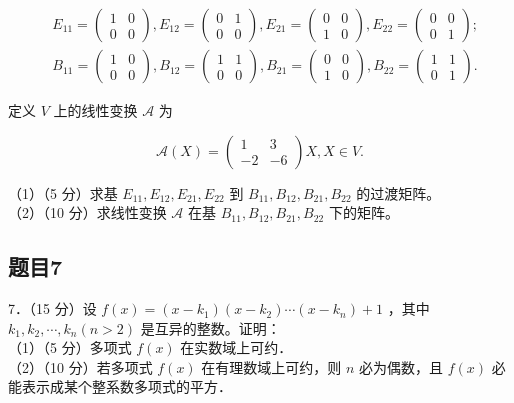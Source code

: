 \documentclass{article}
\begin{document}
\[
\begin{aligned}
& E_{11}=\left(\begin{array}{ll}
1 & 0 \\
0 & 0
\end{array}\right), E_{12}=\left(\begin{array}{ll}
0 & 1 \\
0 & 0
\end{array}\right), E_{21}=\left(\begin{array}{ll}
0 & 0 \\
1 & 0
\end{array}\right), E_{22}=\left(\begin{array}{ll}
0 & 0 \\
0 & 1
\end{array}\right) ; \\
& B_{11}=\left(\begin{array}{ll}
1 & 0 \\
0 & 0
\end{array}\right), B_{12}=\left(\begin{array}{ll}
1 & 1 \\
0 & 0
\end{array}\right), B_{21}=\left(\begin{array}{ll}
0 & 0 \\
1 & 0
\end{array}\right), B_{22}=\left(\begin{array}{ll}
1 & 1 \\
0 & 1
\end{array}\right) .
\end{aligned}
\]

定义 \(V\) 上的线性变换 \(\mathcal{A}\) 为

\[
\mathcal{A}(X)=\left(\begin{array}{cc}
1 & 3 \\
-2 & -6
\end{array}\right) X, X \in V .
\]

（1）（5 分）求基 \(E_{11}, E_{12}, E_{21}, E_{22}\) 到 \(B_{11}, B_{12}, B_{21}, B_{22}\) 的过渡矩阵。\\
（2）（10 分）求线性变换 \(\mathcal{A}\) 在基 \(B_{11}, B_{12}, B_{21}, B_{22}\) 下的矩阵。

\subsection{题目7}
7．（15 分）设 \(f(x)=\left(x-k_{1}\right)\left(x-k_{2}\right) \cdots\left(x-k_{n}\right)+1\) ，其中 \(k_{1}, k_{2}, \cdots, k_{n}(n>2)\) 是互异的整数。证明：\\
（1）（5 分）多项式 \(f(x)\) 在实数域上可约．\\
（2）（10 分）若多项式 \(f(x)\) 在有理数域上可约，则 \(n\) 必为偶数，且 \(f(x)\) 必能表示成某个整系数多项式的平方．
\end{document}
